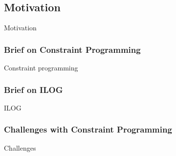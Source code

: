 \subsection{Motivation}
Motivation

\subsubsection{Brief on Constraint Programming}
Constraint programming

\subsubsection{Brief on ILOG}
ILOG

\subsubsection{Challenges with Constraint Programming}
Challenges